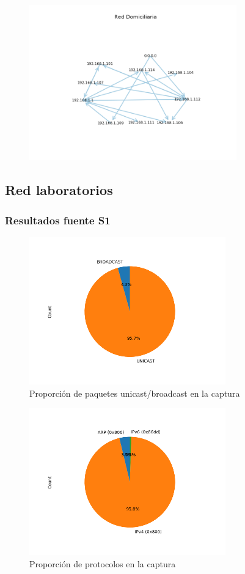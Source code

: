 \begin{figure}[H]
 \centering
	\includegraphics[width=0.8\textwidth]{figs/red_domiciliaria.png}
	\caption{}
	\label{fig:starbucks-grafo}
\end{figure}


\subsection*{Red laboratorios}
\subsubsection*{Resultados fuente S1}
\begin{figure}[H]
  \centering
  \includegraphics[width=8.5cm]{figs/broadcast_proportion_labo6_2018_04_18_S1_output.png}
  \caption{\normalfont Proporción de paquetes unicast/broadcast en la captura}
\end{figure}

\begin{figure}[H]
  \centering
  \includegraphics[width=8.5cm]{figs/protocols_proportion_labo6_2018_04_18_S1_output.png}
  \caption{\normalfont Proporción de protocolos en la captura}
\end{figure}

